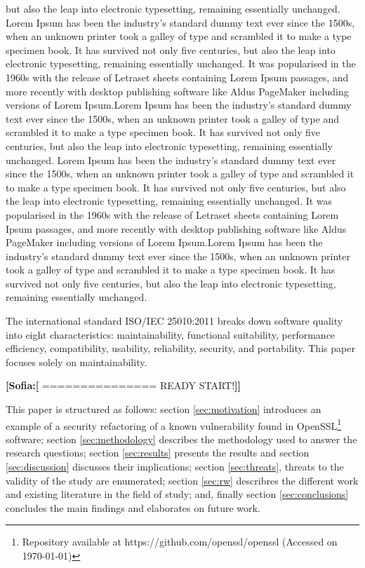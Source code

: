 \documentclass[10pt,conference]{IEEEtran}
\newcommand{\Sof}[1]{\textbf{[Sofia:[}{\color{red} #1}\textbf{]]}}
\begin{document}
but also the leap into electronic typesetting, remaining essentially unchanged. Lorem Ipsum has been the industry's standard dummy text ever since the 1500s, when an unknown printer took a galley of type and scrambled it to make a type specimen book. It has survived not only five centuries, but also the leap into electronic typesetting, remaining essentially unchanged. It was popularised in the 1960s with the release of Letraset sheets containing Lorem Ipsum passages, and more recently with desktop publishing software like Aldus PageMaker including versions of Lorem Ipsum.Lorem Ipsum has been the industry's standard dummy text ever since the 1500s, when an unknown printer took a galley of type and scrambled it to make a type specimen book. It has survived not only five centuries, but also the leap into electronic typesetting, remaining essentially unchanged. Lorem Ipsum has been the industry's standard dummy text ever since the 1500s, when an unknown printer took a galley of type and scrambled it to make a type specimen book. It has survived not only five centuries, but also the leap into electronic typesetting, remaining essentially unchanged. It was popularised in the 1960s with the release of Letraset sheets containing Lorem Ipsum passages, and more recently with desktop publishing software like Aldus PageMaker including versions of Lorem Ipsum.Lorem Ipsum has been the industry's standard dummy text ever since the 1500s, when an unknown printer took a galley of type and scrambled it to make a type specimen book. It has survived not only five centuries, but also the leap into electronic typesetting, remaining essentially unchanged.

The international standard ISO/IEC 25010:2011 breaks down software quality into eight characteristics: maintainability,
functional suitability, performance efficiency, compatibility, usability, reliability, security,
and portability. This paper focuses solely on maintainability.

\Sof{=============== READY START!}

This paper is structured as follows: section \ref{sec:motivation} introduces an
example of a security refactoring of a known vulnerability found in
OpenSSL\footnote{Repository available at
https://github.com/openssl/openssl (Accessed on \today{})} software;
section \ref{sec:methodology} describes the methodology used to answer the
research questions; section \ref{sec:results} presents the results and section
\ref{sec:discussion} discusses their implications; section \ref{sec:threats},
threats to the validity of the study are enumerated; section \ref{sec:rw}
describres the different work and existing literature in the field of study;
and, finally section \ref{sec:conclusions} concludes the main findings and
elaborates on future work.
%
\end{document}

